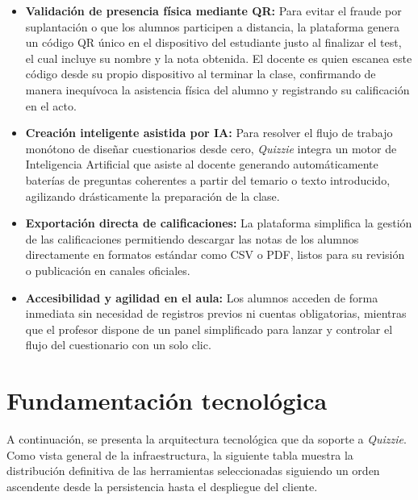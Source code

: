\begin{itemize}
    \item \textbf{Validación de presencia física mediante QR:} Para evitar el fraude por suplantación o que los alumnos participen a distancia, la plataforma genera un código QR único en el dispositivo del estudiante justo al finalizar el test, el cual incluye su nombre y la nota obtenida. El docente es quien escanea este código desde su propio dispositivo al terminar la clase, confirmando de manera inequívoca la asistencia física del alumno y registrando su calificación en el acto.    
    \item \textbf{Creación inteligente asistida por IA:} Para resolver el flujo de trabajo monótono de diseñar cuestionarios desde cero, \textit{Quizzie} integra un motor de Inteligencia Artificial que asiste al docente generando automáticamente baterías de preguntas coherentes a partir del temario o texto introducido, agilizando drásticamente la preparación de la clase.
    \item \textbf{Exportación directa de calificaciones:} La plataforma simplifica la gestión de las calificaciones permitiendo descargar las notas de los alumnos directamente en formatos estándar como CSV o PDF, listos para su revisión o publicación en canales oficiales.
    \item \textbf{Accesibilidad y agilidad en el aula:} Los alumnos acceden de forma inmediata sin necesidad de registros previos ni cuentas obligatorias, mientras que el profesor dispone de un panel simplificado para lanzar y controlar el flujo del cuestionario con un solo clic.
\end{itemize}

\section{Fundamentación tecnológica}\label{sec:fundamentacion_tecnologica}

A continuación, se presenta la arquitectura tecnológica que da soporte a \textit{Quizzie}. Como vista general de la infraestructura, la siguiente tabla muestra la distribución definitiva de las herramientas seleccionadas siguiendo un orden ascendente desde la persistencia hasta el despliegue del cliente.

